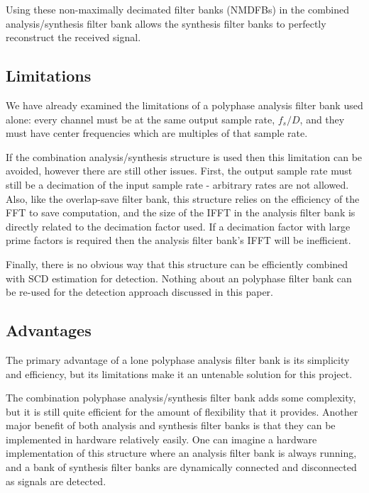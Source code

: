 \documentclass[12pt]{article}
\begin{document}
Using these non-maximally decimated filter banks (NMDFBs) in the combined
analysis/synthesis filter bank allows the synthesis filter banks to perfectly
reconstruct the received signal.

\subsection{Limitations}
\label{sec:poly_limitations}
We have already examined the limitations of a polyphase analysis
filter bank used alone: every channel must be at the same output sample
rate, $f_s/D$, and they must have center frequencies which are multiples of
that sample rate.

If the combination analysis/synthesis structure is used then this limitation
can be avoided, however there are still other issues. First, the output sample
rate must still be a decimation of the input sample rate - arbitrary rates are
not allowed.  Also, like the overlap-save filter bank, this structure relies on
the efficiency of the FFT to save computation, and the size of the IFFT in the
analysis filter bank is directly related to the decimation factor used. If
a decimation factor with large prime factors is required then the analysis
filter bank's IFFT will be inefficient.

Finally, there is no obvious way that this structure can be efficiently
combined with SCD estimation for detection. Nothing about an polyphase filter
bank can be re-used for the detection approach discussed in this paper.


\subsection{Advantages}
\label{sec:poly_advantages}
The primary advantage of a lone polyphase analysis filter bank is its
simplicity and efficiency, but its limitations make it an untenable solution
for this project.

The combination polyphase analysis/synthesis filter bank adds some complexity,
but it is still quite efficient for the amount of flexibility that it provides.
Another major benefit of both analysis and synthesis filter banks is that they
can be implemented in hardware relatively easily. One can imagine a hardware
implementation of this structure where an analysis filter bank is always
running, and a bank of synthesis filter banks are dynamically connected and
disconnected as signals are detected.

\end{document}
